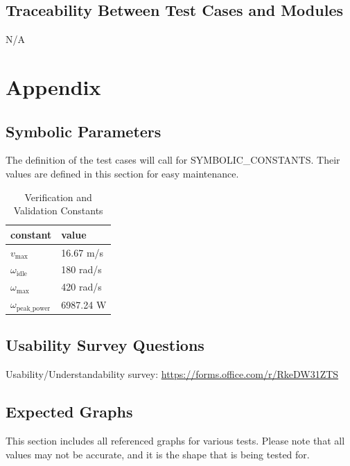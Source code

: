 \documentclass[12pt, titlepage]{article}
\begin{document}
\subsection{Traceability Between Test Cases and Modules}
N/A	





\newpage

\section{Appendix}

\subsection{Symbolic Parameters}

The definition of the test cases will call for SYMBOLIC\_CONSTANTS.
Their values are defined in this section for easy maintenance.

\begin{table}[h]
  \raggedright
  \begin{tabular}{l l} 
    \toprule		
    \textbf{constant} & \textbf{value}\\
    \midrule
    $v_\text{max}$ & 16.67 m/s \\
    $\omega_{\text{idle}}$ & 180 rad/s \\
    $\omega_\text{max}$ & 420 rad/s \\
    $\omega_\text{peak\_power}$ & 6987.24 W \\
    \bottomrule
  \end{tabular}
  \caption{Verification and Validation Constants}
  \label{tab:vnv_constants}
\end{table}

\subsection{Usability Survey Questions} \label{sec:Usability Survey Questions}

Usability/Understandability survey:
\url{https://forms.office.com/r/RkeDW31ZTS}

\subsection{Expected Graphs}
This section includes all referenced graphs for various tests. Please note that all values may not be accurate, and it is the shape that is being tested for.
\end{document}
